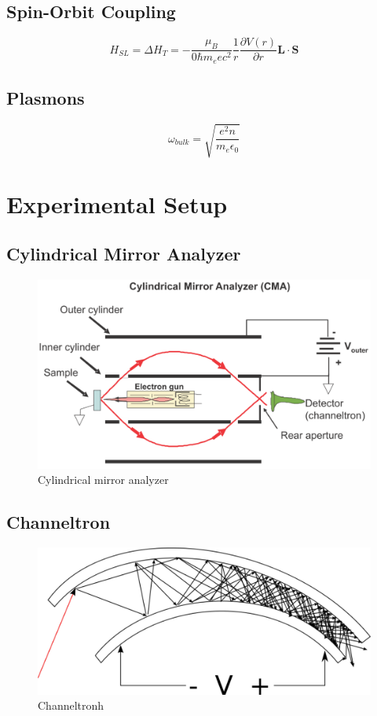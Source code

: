 \documentclass[a4paper,10pt]{scrartcl}
\begin{document}
\subsection{Spin-Orbit Coupling}

\begin{equation}
H_{SL} = \Delta H_{T} = - \frac{\mu_B}{0\hbar m_e e c^2}\frac{1}{r}\frac{\partial V(r)}{\partial r} \boldsymbol{L}\cdot\boldsymbol{S}
\end{equation}

\subsection{Plasmons}

\begin{equation}
\omega_{bulk} = \sqrt{\frac{e^2 n}{m_e \epsilon_0}}
\end{equation}

\section{Experimental Setup}

\subsection{Cylindrical Mirror Analyzer}

\begin{figure}
\centering
\includegraphics[scale=0.35]{img/cma}
\caption{Cylindrical mirror analyzer \label{fig:cma}}
\end{figure}


\subsection{Channeltron}

\begin{figure}
\centering
\includegraphics[scale=0.25]{img/channeltron}
\caption{Channeltronh \label{fig:ct}}
\end{figure}
\end{document}
